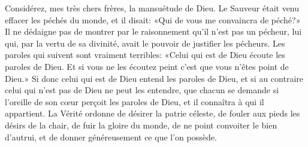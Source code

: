  Considérez, mes très chers frères, la mansuétude de Dieu.
Le Sauveur était venu effacer les péchés du monde, et il disait:
	«Qui de vous me convaincra de péché?»
Il ne dédaigne pas de montrer par le raisonnement qu’il n’est pas un pécheur,
	lui qui, par la vertu de sa divinité,
	avait le pouvoir de justifier les pécheurs.
Les paroles qui suivent sont vraiment terribles:
	«Celui qui est de Dieu écoute les paroles de Dieu.
	Et si vous ne les écoutez peint c’est que vous n’êtes point de Dieu.»
Si donc celui qui est de Dieu entend les paroles de Dieu,
	et si au contraire celui qui n’est pas de Dieu ne peut les entendre,
	que chacun se demande si l’oreille de son cœur perçoit les paroles de Dieu,
	et il connaîtra à qui il appartient.
La Vérité ordonne de désirer la patrie céleste,
	de fouler aux pieds les désirs de la chair,
	de fuir la gloire du monde,
	de ne point convoiter le bien d’autrui,
	et de donner généreusement ce que l’on possède.
